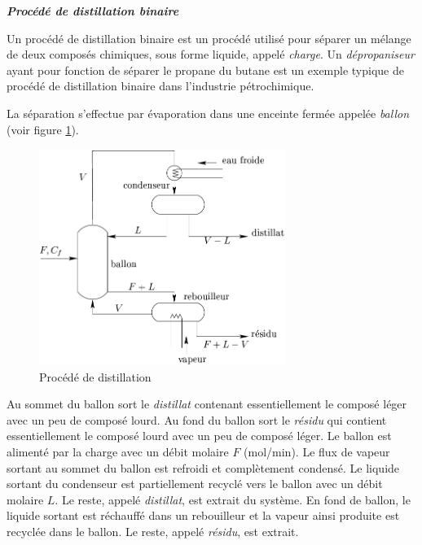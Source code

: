 \begin{exemple}{\bf \em Procédé de distillation binaire}

Un procédé de distillation binaire est un procédé utilisé pour séparer un
mélange de deux composés chimiques, sous forme liquide, appelé {\em charge}. Un {\it
dépropaniseur} ayant pour fonction de séparer le propane du butane est un
exemple typique de procédé de distillation binaire dans l'industrie pétrochimique.

La séparation s'effectue par évaporation dans une enceinte fermée appelée {\em ballon} (voir figure \ref{Fig:distillation}).
\begin{figure}[h]
\begin{center}
\includegraphics[width=8cm]{images/proc_distil}
\caption{Procédé de distillation}
\label{Fig:distillation}
\end{center} 
\end{figure}
Au sommet du ballon sort le {\it distillat} contenant essentiellement le composé léger avec
un peu de composé lourd. Au fond du ballon sort le {\it résidu} qui contient
essentiellement le composé lourd avec un peu de composé léger. Le ballon est alimenté par la charge avec un débit molaire $F$ (mol/min). Le flux de vapeur sortant au sommet du ballon est refroidi et complètement condensé. Le liquide
sortant du condenseur est partiellement recyclé vers le ballon avec un débit
molaire $L$. Le reste, appelé {\it distillat}, est extrait du système. En fond de
ballon, le liquide sortant est
réchauffé dans un rebouilleur et la vapeur ainsi produite est recyclée dans le ballon.  Le reste, appelé {\it résidu}, est extrait.


\end{exemple}
